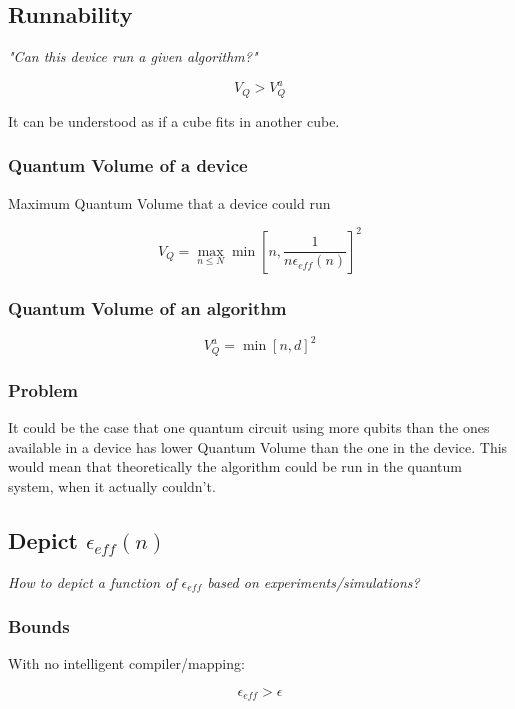 \documentclass[11pt]{article}
\begin{document}
\subsection{Runnability}
\label{sec:org2ddfc91}

\emph{"Can this device run a given algorithm?"}

$$V_Q > V_Q^a$$

It can be understood as if a cube fits in another cube.

\subsubsection{Quantum Volume of a device}
\label{sec:org7ed3053}

Maximum Quantum Volume that a device could run

$$V_Q = \max_{n \le N} \min \left[ n,\frac{1}{n \epsilon_{eff} (n)}\right]^2$$

\subsubsection{Quantum Volume of an algorithm}
\label{sec:org88a8027}

$$V_Q^a = \min \left[ n,d \right]^2$$

\subsubsection{Problem}
\label{sec:org13b06a0}

It could be the case that one quantum circuit using more qubits than the ones available in a device has lower Quantum Volume than the one in the device. This would mean that theoretically the algorithm could be run in the quantum system, when it actually couldn't.

\subsection{Depict \(\epsilon_{eff}(n)\)}
\label{sec:orgbaa342e}

\emph{How to depict a function of \(\epsilon_{eff}\) based on experiments/simulations?}

\subsubsection{Bounds}
\label{sec:org2f511bc}

With no intelligent compiler/mapping:

$$\epsilon_{eff} > \epsilon$$
\end{document}
